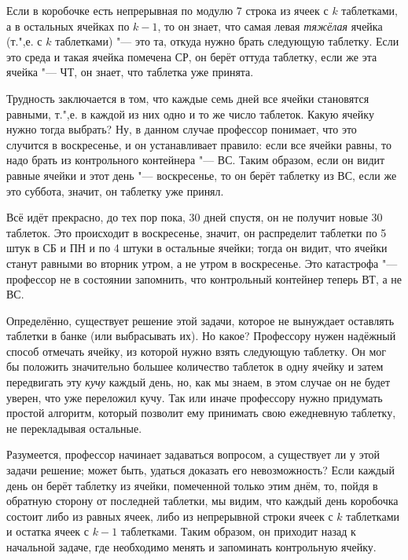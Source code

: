 \documentclass[twoside]{book}
\begin{document}
\medskip
 Если в коробочке есть непрерывная по модулю 7 строка из ячеек с $k$ таблетками, а в остальных ячейках по $k-1$, то он знает, что самая левая \emph{тяжёлая} ячейка (т.",е. с $k$ таблетками) "--- это та, откуда нужно брать следующую таблетку.
Если это среда и такая ячейка помечена СР, он берёт оттуда таблетку, если же эта ячейка "--- ЧТ, он знает, что таблетка уже принята.

\medskip
Трудность заключается в том, что каждые семь дней все ячейки становятся равными, т.",е. в каждой из них одно и то же число таблеток.
Какую ячейку нужно тогда выбрать?
Ну, в данном случае профессор понимает, что это случится в воскресенье, и он устанавливает правило: если все ячейки равны, то надо брать из контрольного контейнера "--- ВС.
Таким образом, если он видит равные ячейки и этот день "--- воскресенье, то он берёт таблетку из ВС, если же это суббота, значит, он таблетку уже принял.

Всё идёт прекрасно, до тех пор пока, 30 дней спустя, он не получит новые 30 таблеток.
Это происходит в воскресенье, значит, он распределит таблетки по 5 штук в СБ и ПН и по 4 штуки в остальные ячейки;
тогда он видит, что ячейки станут равными во вторник утром, а не утром в воскресенье.
Это катастрофа "--- профессор не в состоянии запомнить, что контрольный контейнер теперь ВТ, а не ВС.

Определённо, существует решение этой задачи, которое не вынуждает оставлять таблетки в банке (или выбрасывать их).
Но какое? Профессору нужен надёжный способ отмечать ячейку, из которой нужно взять следующую таблетку.
Он мог бы положить значительно большее количество таблеток в одну ячейку и затем передвигать эту \emph{кучу} каждый день, но, как мы знаем, в этом случае он не будет уверен, что уже переложил кучу.
Так или иначе профессору нужно придумать простой алгоритм, который позволит ему принимать свою ежедневную таблетку, не перекладывая остальные.

Разумеется, профессор начинает задаваться вопросом, а существует ли у этой задачи решение;
может быть, удаться доказать его невозможность?
Если каждый день он берёт таблетку из ячейки, помеченной только этим днём, то, пойдя в обратную сторону от последней таблетки, мы видим, что каждый день коробочка состоит либо из равных ячеек, либо из непрерывной строки ячеек с $k$ таблетками и остатка ячеек с $k-1$ таблетками.
Таким образом, он приходит назад к начальной задаче, где необходимо менять и запоминать контрольную ячейку.
\end{document}
